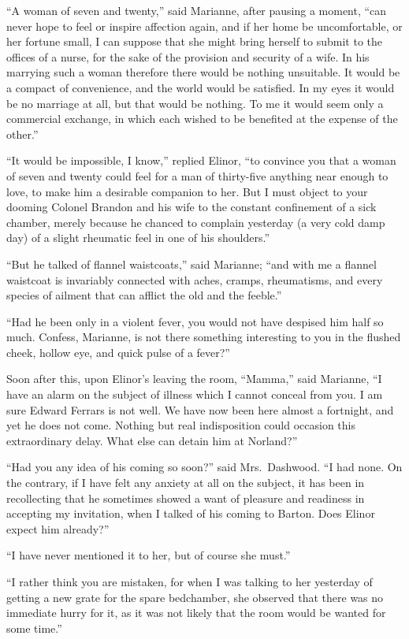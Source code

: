 ``A woman of seven and twenty,'' said Marianne,
after pausing a moment, ``can never hope to feel or inspire
affection again, and if her home be uncomfortable,
or her fortune small, I can suppose that she might
bring herself to submit to the offices of a nurse,
for the sake of the provision and security of a wife.
In his marrying such a woman therefore there would be
nothing unsuitable.  It would be a compact of convenience,
and the world would be satisfied.  In my eyes it would
be no marriage at all, but that would be nothing.
To me it would seem only a commercial exchange, in which
each wished to be benefited at the expense of the other.''

``It would be impossible, I know,'' replied Elinor,
``to convince you that a woman of seven and twenty could
feel for a man of thirty-five anything near enough
to love, to make him a desirable companion to her.
But I must object to your dooming Colonel Brandon and
his wife to the constant confinement of a sick chamber,
merely because he chanced to complain yesterday (a
very cold damp day) of a slight rheumatic feel in one
of his shoulders.''

``But he talked of flannel waistcoats,'' said Marianne;
``and with me a flannel waistcoat is invariably connected
with aches, cramps, rheumatisms, and every species of
ailment that can afflict the old and the feeble.''

``Had he been only in a violent fever, you would not
have despised him half so much.  Confess, Marianne, is not
there something interesting to you in the flushed cheek,
hollow eye, and quick pulse of a fever?''

Soon after this, upon Elinor's leaving the room,
``Mamma,'' said Marianne, ``I have an alarm on the subject
of illness which I cannot conceal from you.  I am sure
Edward Ferrars is not well.  We have now been here almost
a fortnight, and yet he does not come.  Nothing but real
indisposition could occasion this extraordinary delay.
What else can detain him at Norland?''

``Had you any idea of his coming so soon?''
said Mrs.\ Dashwood.  ``I had none.  On the contrary,
if I have felt any anxiety at all on the subject, it has
been in recollecting that he sometimes showed a want
of pleasure and readiness in accepting my invitation,
when I talked of his coming to Barton.  Does Elinor
expect him already?''

``I have never mentioned it to her, but of course
she must.''

``I rather think you are mistaken, for when I
was talking to her yesterday of getting a new grate
for the spare bedchamber, she observed that there
was no immediate hurry for it, as it was not likely
that the room would be wanted for some time.''

